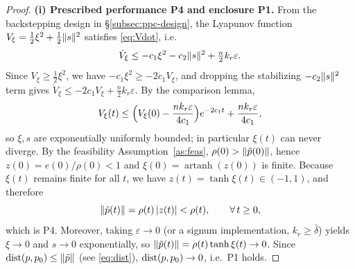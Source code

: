 \begin{proof}
\noindent\textbf{(i) Prescribed performance P4 and enclosure P1.}
From the backstepping design in \S\ref{subsec:ppc-design}, the Lyapunov
function $V_\xi=\frac12\xi^2+\frac12\lVert s \rVert^2$ satisfies \eqref{eq:Vdot},
i.e.
\[
\dot V_\xi \le -c_1\xi^2 - c_2\lVert s \rVert^2 + \tfrac{n}{2}k_r\varepsilon.
\]
Since $V_\xi\ge\frac12\xi^2$, we have $-c_1\xi^2\ge -2c_1V_\xi$, and dropping
the stabilizing $-c_2\lVert s \rVert^2$ term gives
$\dot V_\xi\le -2c_1V_\xi+\frac{n}{2}k_r\varepsilon$. By the comparison
lemma,
\[
V_\xi(t)\le
\Bigl(V_\xi(0)-\frac{n k_r\varepsilon}{4c_1}\Bigr)e^{-2c_1t}
+ \frac{n k_r\varepsilon}{4c_1},
\]
so $\xi,s$ are exponentially uniformly bounded; in particular $\xi(t)$ can
never diverge. By the feasibility Assumption~\ref{as:feas},
$\rho(0)>\lVert \tilde p(0) \rVert$, hence $z(0)=e(0)/\rho(0)<1$ and
$\xi(0)=\operatorname{artanh}(z(0))$ is finite. Because $\xi(t)$ remains
finite for all $t$, we have $z(t)=\tanh\xi(t)\in(-1,1)$, and therefore
\[
\lVert \tilde p(t) \rVert = \rho(t)\,|z(t)| < \rho(t), \qquad \forall\,t\ge0,
\]
which is P4. Moreover, taking $\varepsilon\to0$ (or a signum
implementation, $k_r\ge\bar\delta$) yields $\xi\to0$ and $s\to0$
exponentially, so $\lVert \tilde p(t) \rVert=\rho(t)\tanh\xi(t)\to0$. Since
$\mathrm{dist}(p,p_0)\le\lVert \tilde p \rVert$ (see \eqref{eq:dist}),
$\mathrm{dist}(p,p_0)\to0$, i.e.\ P1 holds.


\end{proof}
